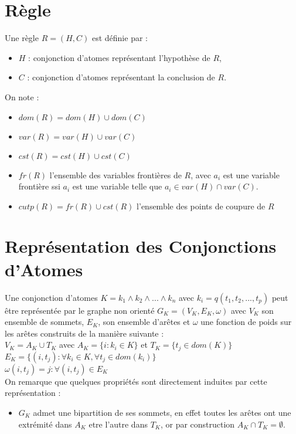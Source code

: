 
\section{R\`egle}\label{def_regle}
Une r\`egle $R = (H,C)$ est d\'efinie par :
\begin{itemize}
	\item $H$ : conjonction d'atomes repr\'esentant l'hypoth\`ese de $R$,
	\item $C$ : conjonction d'atomes repr\'esentant la conclusion de $R$.
\end{itemize}

On note :
\begin{itemize}
	\item $dom(R) = dom(H) \cup dom(C)$
	\item $var(R) = var(H) \cup var(C)$
	\item $cst(R) = cst(H) \cup cst(C)$
	\item $fr(R)$ l'ensemble des variables fronti\`eres de $R$, avec $a_{i}$ est une variable fronti\`ere ssi $a_{i}$ est une variable telle que $a_{i} \in var(H) \cap var(C)$.
	\item $cutp(R) = fr(R) \cup cst(R)$ l'ensemble des points de coupure de $R$
\end{itemize}

\section{Repr\'esentation des Conjonctions d'Atomes}\label{def_representation}
Une conjonction d'atomes 
$K = k_{1} \wedge k_{2} \wedge ... \wedge k_{n}$ avec $k_{i} = q(t_{1}, t_{2}, ..., t_{p})$
peut \^etre repr\'esent\'ee par le graphe non orient\'e $G_{K} = (V_{K},E_{K},\omega)$
avec $V_{K}$ son ensemble de sommets, $E_{K}$,
son ensemble d'ar\^etes et $\omega$ une fonction de poids sur les ar\^etes construits de la mani\`ere suivante : \\
$V_{K} = A_{K} \cup T_{K}$ avec $A_{K} = \{i : k_{i} \in K\}$ et $T_{K} = \{t_{j} \in dom(K)\}$ \\
$E_{K} = \{(i,t_{j}) : \forall k_{i} \in K, \forall t_{j} \in dom(k_{i})\}$ \\
$\omega(i,t_{j}) = j : \forall (i,t_{j}) \in E_{K}$ \\

On remarque que quelques propri\'et\'es sont directement induites par cette repr\'esentation :
\begin{itemize}
	\item $G_{K}$ admet une bipartition de ses sommets, en effet toutes les ar\^etes ont une extr\'emit\'e dans $A_{K}$ etre
	l'autre dans $T_{K}$, or par construction $A_{K} \cap T_{K} = \emptyset$.
\end{itemize}

